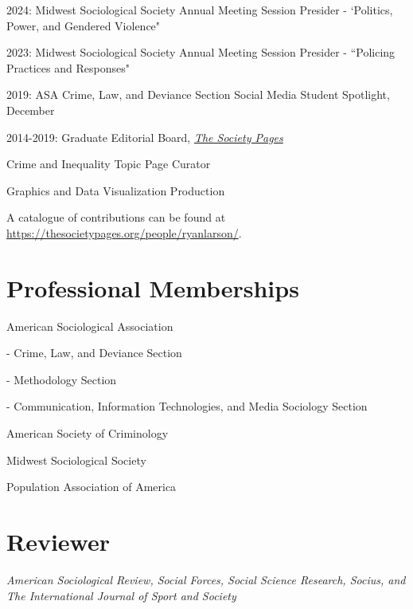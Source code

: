 \documentclass[letterpaper]{article}
\renewenvironment{itemize}{
  \begin{list}{}{
    \setlength{\leftmargin}{1.5em}
  }
}{
  \end{list}
}
\begin{document}
\begin{itemize}

\item 2024: Midwest Sociological Society Annual Meeting Session Presider - `Politics, Power, and Gendered Violence"

\item 2023: Midwest Sociological Society Annual Meeting Session Presider - ``Policing Practices and Responses"

\item 2019: ASA Crime, Law, and Deviance Section Social Media Student Spotlight, December

\item  2014-2019:  Graduate Editorial Board, \href{http://thesocietypages.org/}{\textit{The Society Pages}}
\begin{itemize}
\item Crime and Inequality Topic Page Curator
\item Graphics and Data Visualization Production
\item A catalogue of contributions can be found at \href{https://thesocietypages.org/people/ryanlarson/}{https://thesocietypages.org/people/ryanlarson/}.
\end{itemize}

\end{itemize}


\section*{\textbf{Professional Memberships}}
\begin{itemize}

\item American Sociological Association
\begin{itemize}
\item - Crime, Law, and Deviance Section
\item - Methodology Section
\item - Communication, Information Technologies, and Media Sociology Section
\end{itemize}
\item American Society of Criminology
\item Midwest Sociological Society
\item Population Association of America

\end{itemize}

\section*{\textbf{Reviewer}}

\textit{American Sociological Review, Social Forces, Social Science Research, Socius, and The International Journal of Sport and Society}
\end{document}
